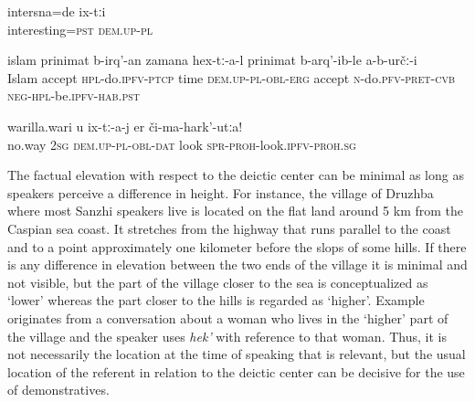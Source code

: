 \begin{exe}
		\label{They were interesting.}
	\sn
	\gll	intersna=de	ix-tːi \\
		interesting=\textsc{pst}	\textsc{dem.up}-\textsc{pl}\\
	\glt	{}

		\label{At the time when we became Muslims, they did not become Muslims.}
	\sn
	\gll	islam	prinimat	b-irq'-an	zamana	hex-tː-a-l	prinimat	b-arq'-ib-le	a-b-určː-i\\
		Islam	accept	\textsc{hpl}-do.\textsc{ipfv}-\textsc{ptcp}	time		\textsc{dem.up}-\textsc{pl}-\textsc{obl}-\textsc{erg}	accept	\textsc{n}-do.\textsc{pfv}-\textsc{pret}-\textsc{cvb}	\textsc{neg}-\textsc{hpl}-be.\textsc{ipfv}-\textsc{hab.}\textsc{\textsc{pst}}\\
	\glt	{}

		\label{Whatever may happen, do not look at them}
	\sn
	\gll	warilla.wari	u	ix-tː-a-j	er	či-ma-hark'-utːa!\\
		no.way	\textsc{2sg}	\textsc{dem.up}-\textsc{pl}-\textsc{obl}-\textsc{dat}	look	\textsc{spr}-\textsc{proh}-look.\textsc{ipfv}-\textsc{proh.sg}\\	
	\glt	{}

\end{exe}

The factual elevation with respect to the deictic center can be minimal as long as speakers perceive a difference in height. For instance, the village of Druzhba where most Sanzhi speakers live is located on the flat land around 5 km from the Caspian sea coast. It stretches from the highway that runs parallel to the coast and to a point approximately one kilometer before the slops of some hills. If there is any difference in elevation between the two ends of the village it is minimal and not visible, but the part of the village closer to the sea is conceptualized as ‘lower' whereas the part closer to the hills is regarded as `higher'. Example  originates from a conversation about a woman who lives in the ‘higher' part of the village and the speaker uses \textit{hek'} with reference to that woman. Thus, it is not necessarily the location at the time of speaking that is relevant, but the usual location of the referent in relation to the deictic center can be decisive for the use of demonstratives.

